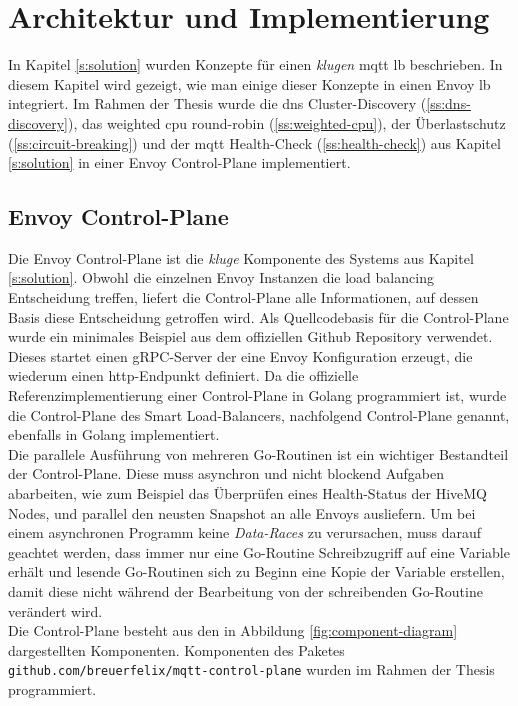 \section{Architektur und Implementierung} \label{s:implementation}
In Kapitel \ref{s:solution} wurden Konzepte für einen \textit{klugen} \ac{mqtt} \acl{lb} beschrieben. In diesem Kapitel wird gezeigt, wie man einige dieser Konzepte in einen Envoy \acl{lb} integriert.
Im Rahmen der Thesis wurde die \ac{dns} Cluster-Discovery (\ref{ss:dns-discovery}), das weighted \ac{cpu} round-robin (\ref{ss:weighted-cpu}), der Überlastschutz (\ref{ss:circuit-breaking}) und der \ac{mqtt} Health-Check (\ref{ss:health-check}) aus Kapitel \ref{s:solution} in einer Envoy Control-Plane implementiert.

\subsection{Envoy Control-Plane} \label{si:control-plane}
Die Envoy Control-Plane ist die \textit{kluge} Komponente des Systems aus Kapitel \ref{s:solution}. Obwohl die einzelnen Envoy Instanzen die load balancing Entscheidung treffen, liefert die Control-Plane alle Informationen, auf dessen Basis diese Entscheidung getroffen wird.
Als Quellcodebasis für die Control-Plane wurde ein minimales Beispiel aus dem offiziellen Github Repository \cite{EnvoyproxyGocontrolplane} verwendet.
Dieses startet einen gRPC-Server der eine Envoy Konfiguration erzeugt, die wiederum einen \ac{http}-Endpunkt definiert. Da die offizielle Referenzimplementierung einer Control-Plane in Golang programmiert ist, wurde die Control-Plane des Smart Load-Balancers, nachfolgend Control-Plane genannt, ebenfalls in Golang implementiert.
\\
Die parallele Ausführung von mehreren Go-Routinen ist ein wichtiger Bestandteil der Control-Plane. Diese muss asynchron und nicht blockend Aufgaben abarbeiten, wie zum Beispiel das Überprüfen eines Health-Status der HiveMQ Nodes, und parallel den neusten Snapshot an alle Envoys ausliefern.
Um bei einem asynchronen Programm keine \textit{Data-Races} zu verursachen, muss darauf geachtet werden, dass immer nur eine Go-Routine Schreibzugriff auf eine Variable erhält und lesende Go-Routinen sich zu Beginn eine Kopie der Variable erstellen, damit diese nicht während der Bearbeitung von der schreibenden Go-Routine verändert wird.
\\
Die Control-Plane besteht aus den in Abbildung \ref{fig:component-diagram} dargestellten Komponenten. Komponenten des Paketes \verb|github.com/breuerfelix/mqtt-control-plane| wurden im Rahmen der Thesis programmiert.
